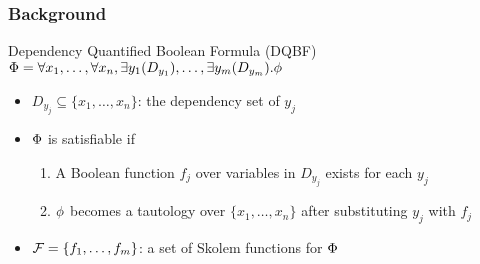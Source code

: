 \begin{frame}
  \frametitle{Background}
  \begin{block}{Dependency Quantified Boolean Formula (DQBF)}
    $\Phi=\forall x_1, \ldots, \forall x_n, \exists y_1(D_{y_1}), \ldots, \exists y_m(D_{y_m}).\phi$
    \pause
    \begin{itemize}
      \item $D_{y_j} \subseteq \{x_1,\ldots,x_n\}$: the \alert{dependency set} of $y_j$
            \pause
      \item $\Phi$ is satisfiable if
            \pause
            \begin{enumerate}
              \item A Boolean function $f_j$ over variables in $D_{y_j}$ exists for each $y_j$
                    \pause
              \item $\phi$ becomes a tautology over $\{x_1,\ldots,x_n\}$ after substituting $y_j$ with $f_j$
            \end{enumerate}
            \pause
      \item $\mathcal{F}=\{f_1,\ldots,f_m\}$: a set of Skolem functions for $\Phi$
    \end{itemize}
  \end{block}
\end{frame}